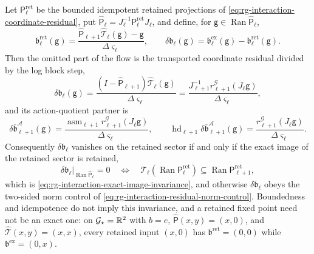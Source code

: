 Let \(\mathsf P^{\mathrm{ret}}_\ell\) be the bounded idempotent retained projections
of \eqref{eq:rg-interaction-coordinate-residual}, put
\(\widehat{\mathsf P}_\ell=J_\ell^{-1}\mathsf P^{\mathrm{ret}}_\ell J_\ell\), and define, for
\(\mathsf g\in\operatorname{Ran}\widehat{\mathsf P}_\ell\),
\begin{equation}
\mathfrak b^{\mathrm{ret}}_\ell(\mathsf g)
=\frac{\widehat{\mathsf P}_{\ell+1}\widehat{\mathcal T}_\ell(\mathsf g)-\mathsf g}{\Delta\varsigma_\ell},
\qquad
\delta\mathfrak b_\ell(\mathsf g)
=\mathfrak b^{\mathrm{ex}}_\ell(\mathsf g)-\mathfrak b^{\mathrm{ret}}_\ell(\mathsf g).
\label{eq:rg-retained-beta}
\end{equation}
Then the omitted part of the flow is the transported coordinate residual
divided by the log block step,
\begin{equation}
\delta\mathfrak b_\ell(\mathsf g)
=\frac{(I-\widehat{\mathsf P}_{\ell+1})\widehat{\mathcal T}_\ell(\mathsf g)}{\Delta\varsigma_\ell}
=\frac{J_{\ell+1}^{-1}r^{\mathcal G}_{\ell+1}(J_\ell\mathsf g)}{\Delta\varsigma_\ell},
\label{eq:rg-beta-residual-identity}
\end{equation}
and its action-quotient partner is
\begin{equation}
\delta\overline{\mathfrak b}^{\mathcal A}_{\ell+1}(\mathsf g)
=\frac{\operatorname{asm}_{\ell+1}r^{\mathcal G}_{\ell+1}(J_\ell\mathsf g)}{\Delta\varsigma_\ell},
\qquad
\operatorname{hd}_{\ell+1}\delta\overline{\mathfrak b}^{\mathcal A}_{\ell+1}(\mathsf g)
=\frac{r^{\mathcal G}_{\ell+1}(J_\ell\mathsf g)}{\Delta\varsigma_\ell}.
\label{eq:rg-beta-residual-quotient}
\end{equation}
Consequently \(\delta\mathfrak b_\ell\) vanishes on the retained sector if and
only if the exact image of the retained sector is retained,
\begin{equation}
\delta\mathfrak b_\ell\big|_{\operatorname{Ran}\widehat{\mathsf P}_\ell}=0
\quad\Longleftrightarrow\quad
\mathcal T_\ell(\operatorname{Ran}\mathsf P^{\mathrm{ret}}_\ell)
\subseteq\operatorname{Ran}\mathsf P^{\mathrm{ret}}_{\ell+1},
\label{eq:rg-beta-exactness-criterion}
\end{equation}
which is \eqref{eq:rg-interaction-exact-image-invariance}, and otherwise
\(\delta\mathfrak b_\ell\) obeys the two-sided norm control of
\eqref{eq:rg-interaction-residual-norm-control}. Boundedness and idempotence do
not imply this invariance, and a retained fixed point need not be an exact
one: on \(\mathcal G_\star=\mathbb R^2\) with \(b=e\), \(\widehat{\mathsf P}(x,y)=(x,0)\), and
\(\widehat{\mathcal T}(x,y)=(x,x)\), every retained input \((x,0)\) has
\(\mathfrak b^{\mathrm{ret}}=(0,0)\) while
\(\mathfrak b^{\mathrm{ex}}=(0,x)\). 

